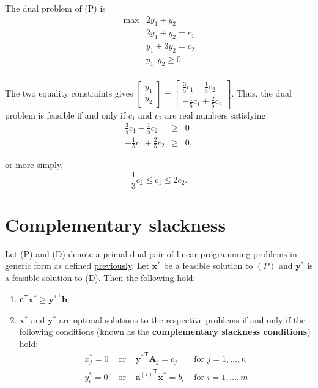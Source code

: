 \documentclass[]{book}
\newcommand{\T}{\mathsf{T}}
\newcommand{\mm}[1]{\mathbf{#1}}
\renewcommand{\vec}[1]{\mathbf{#1}}
\theoremstyle{definition}
\theoremstyle{definition}
\theoremstyle{remark}
\let\BeginKnitrBlock\begin \let\EndKnitrBlock\end
\begin{document}
\begin{enumerate}
  The dual problem of (P) is \[\begin{array}{rl}
  \max & 2 y_1 + y_2 \\
  & 2y_1 + y_2 = c_1 \\
  & y_1 + 3y_2 = c_2 \\
  & y_1 , y_2 \geq 0. \\
  \end{array}
  \]

  The two equality constraints gives
  \(\begin{bmatrix} y_1 \\ y_2 \end{bmatrix} = \begin{bmatrix} \frac{3}{5}c_1 - \frac{1}{5} c_2 \\ -\frac{1}{5}c_1 + \frac{2}{5} c_2 \end{bmatrix}.\)
  Thus, the dual problem is feasible if and only if \(c_1\) and \(c_2\)
  are real numbers satisfying
  \begin{align*}
  \frac{3}{5}c_1 - \frac{1}{5} c_2 & \geq & 0 \\
  -\frac{1}{5}c_1 + \frac{2}{5} c_2  & \geq & 0,
  \end{align*}

  or more simply, \[\frac{1}{3} c_2 \leq c_1 \leq 2 c_2.\]
\end{enumerate}

\chapter{Complementary slackness}\label{complementary-slackness}

\BeginKnitrBlock{theorem}
\protect\hypertarget{thm:weak-duality-cs}{}{\label{thm:weak-duality-cs}}Let
(P) and (D) denote a primal-dual pair of linear programming problems in
generic form as defined \protect\hyperlink{primal-dual}{previously}. Let
\(\vec{x}^*\) be a feasible solution to \((P)\) and \(\vec{y}^*\) is a
feasible solution to (D). Then the following hold:

\begin{enumerate}
\def\labelenumi{\arabic{enumi}.}
\item
  \(\vec{c}^\T\vec{x}^* \geq \vec{y^*}^\T\vec{b}\).
\item
  \(\vec{x}^*\) and \(\vec{y}^*\) are optimal solutions to the
  respective problems if and only if the following conditions (known as
  the \textbf{complementary slackness conditions}) hold: \[
  \begin{array}{rcll}
  x^*_j = 0 & \text{ or } & \vec{y^*}^\T \mm{A}_j = c_j & \text{ for }
  j = 1,\ldots, n \\
  y^*_i = 0 & \text{ or } & {\vec{a}^{(i)}}^\T 
  \vec{x^*} = b_i & \text{ for } i = 1,\ldots, m
  \end{array}
  \]
\end{enumerate}
\EndKnitrBlock{theorem}
\end{document}
